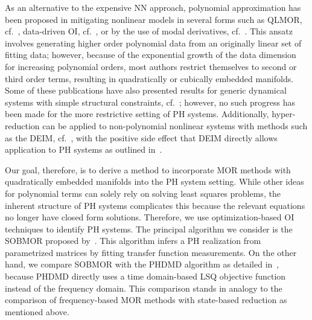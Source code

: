 As an alternative to the expensive \ac{NN} approach, polynomial approximation has been proposed in mitigating nonlinear models in several forms such as QLMOR, cf.~\cite{Gu2011}, data-driven \ac{OI}, cf.~\cite{Peherstorfer2016, Kramer2019, BGK2020, Qian2022, Geelen2023, Sharma2023}, or by the use of modal derivatives, cf.~\cite{Jain2017, Rutzmoser2017}.
This ansatz involves generating higher order polynomial data from an originally linear set of fitting data; however, because of the exponential growth of the data dimension for increasing polynomial orders, most authors restrict themselves to second or third order terms, resulting in quadratically or cubically embedded manifolds.
Some of these publications have also presented results for generic dynamical systems with simple structural constraints, cf.~\cite{BGH2020, Qian2020, Gosea2021, Khodabakhshi2022}; however, no such progress has been made for the more restrictive setting of \ac{PH} systems.
Additionally, hyper-reduction can be applied to non-polynomial nonlinear systems with methods such as the \ac{DEIM}, cf.~\cite{Chaturantabut2010}, with the positive side effect that \ac{DEIM} directly allows application to \ac{PH} systems as outlined in~\cite{Chaturantabut2016}.

Our goal, therefore, is to derive a method to incorporate \ac{MOR} methods with quadratically embedded manifolds into the \ac{PH} system setting.
While other ideas for polynomial terms can solely rely on solving least squares problems, the inherent structure of \ac{PH} systems complicates this because the relevant equations no longer have closed form solutions.
Therefore, we use optimization-based \ac{OI} techniques to identify \ac{PH} systems.
The principal algorithm we consider is the \ac{SOBMOR} proposed by~\cite{SV2023}.
This algorithm infers a \ac{PH} realization from parametrized matrices by fitting transfer function measurements.
On the other hand, we compare \ac{SOBMOR} with the \ac{PHDMD} algorithm as detailed in~\cite{Morandin2023}, because \ac{PHDMD} directly uses a time domain-based \ac{LSQ} objective function instead of the frequency domain.
This comparison stands in analogy to the comparison of frequency-based \ac{MOR} methods with state-based reduction as mentioned above.

